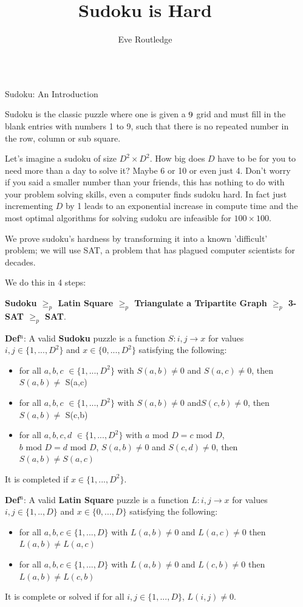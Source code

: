\documentclass[final]{beamer}
\title{Sudoku is Hard}
\author{Eve Routledge}
\institute[shortinst]{Durham University, Supervisor: Prof. Peter Craig}
\newlength{\sepwidth}
\newlength{\colwidth}
\newcounter{row}
\newcounter{col}
\newcommand{\separatorcolumn}{\begin{column}{\sepwidth}\end{column}}
\begin{document}
\begin{frame}[t]
\begin{columns}[t]
\separatorcolumn

\begin{column}{\colwidth}
  \begin{exampleblock}{Sudoku: An Introduction}

Sudoku is the classic puzzle where one is given a $9\time 9$ grid and must fill in the blank entries with numbers 1 to 9, such that there is no repeated number in the row, column or sub square.

Let's imagine a sudoku of size $D^2\times D^2$. How big does $D$ have to be for you to need more than a day to solve it? Maybe 6 or 10 or even just 4. Don't worry if you said a smaller number than your friends, this has nothing to do with your problem solving skills, even a computer finds sudoku hard. In fact just incrementing $D$ by 1 leads to an exponential increase in compute time and the most optimal algorithms for solving sudoku are infeasible for $100 \times 100$.

We prove sudoku's hardness by transforming it into a known 'difficult' problem; we will use SAT, a problem that has plagued computer scientists for decades. 

We do this in 4 steps:

   \textbf{Sudoku $\geq_p$ Latin Square $\geq_p$ Triangulate a Tripartite Graph $\geq_p$ 3-SAT $\geq_p$ SAT}.

	\textbf{Def$^\text{n}$}: A valid \textbf{Sudoku} puzzle is a function $ S: i,j \rightarrow x$ for values $i,j \in \{1,...,D^2\}$ and $x \in \{0,...,D^2\}$ satisfying the following:
\begin{itemize}
	\item{for all $a,b,c$  $\in \{1,...,D^2\}$ with $S(a,b)\neq 0$ and $S(a,c)\neq 0$, then $ S(a,b)\neq$ S(a,c) }
	\item{for all $a,b,c$  $\in \{1,...,D^2\}$ with $S(a,b)\neq 0$ and$ S(c,b)\neq 0$, then $S(a,b)\neq$ S(c,b) }
	\item{for all $ a,b,c,d $ $\in \{1,...,D^2\}$ with $a\text{ mod }D = c\text{ mod }D$, $b\text{ mod }D  =  d\text{ mod }D$, $S(a,b)\neq 0$  and $S(c,d) \neq 0$, then $S(a,b)\neq S(a,c)$ }
\end{itemize}
It is completed if $x \in \{1,...,D^2\}$.


\textbf{Def$^\text{n}$}: A valid \textbf{Latin Square} puzzle is a function $L:i,j \rightarrow x$ for values $i,j \in \{1,..,D\} $ and $x \in \{0,...,D\}$ satisfying the following:
\begin{itemize}
\item{for all $a,b,c \in \{1,...,D\}$ with $L(a,b) \neq 0 $ and $L(a,c) \neq 0$ then $L(a,b) \neq L(a,c)$}
\item{for all $a,b,c \in \{1,...,D\}$ with $L(a,b) \neq 0 $ and $L(c,b) \neq 0$ then $L(a,b) \neq L(c,b)$}
\end{itemize}
It is complete or solved if for all $i,j \in \{1,...,D\}$, $L(i,j) \neq 0$.


\end{exampleblock}
\end{column}
\end{columns}
\end{frame}
\end{document}
